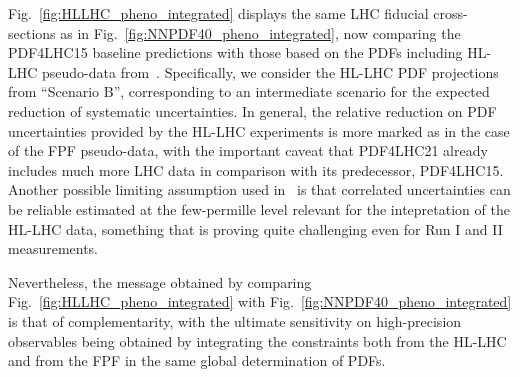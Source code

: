 Fig.~\ref{fig:HLLHC_pheno_integrated} displays the
same LHC fiducial cross-sections as in Fig.~\ref{fig:NNPDF40_pheno_integrated},
now comparing the PDF4LHC15 baseline predictions with those based
on the PDFs including HL-LHC pseudo-data from~\cite{AbdulKhalek:2018rok}.
%
Specifically, we consider the HL-LHC PDF projections
from ``Scenario B'', corresponding to an intermediate scenario for the expected reduction
of systematic uncertainties.
%
In general, the relative reduction on PDF uncertainties provided by the HL-LHC experiments
is more marked as in the case of the FPF pseudo-data, with the important caveat that
PDF4LHC21 already includes much more LHC data in comparison with its predecessor,
PDF4LHC15.
%
Another possible limiting assumption used in~\cite{AbdulKhalek:2018rok} is that
correlated uncertainties can be reliable estimated at the few-permille level
relevant for the intepretation of the HL-LHC data, something that is proving quite challenging
even for Run I and II measurements.

Nevertheless, the message obtained by comparing Fig.~\ref{fig:HLLHC_pheno_integrated} 
 with Fig.~\ref{fig:NNPDF40_pheno_integrated} is that of complementarity,
with the ultimate sensitivity on high-precision observables being
obtained by integrating the constraints both from the HL-LHC and from the FPF
in the same global determination of PDFs.


